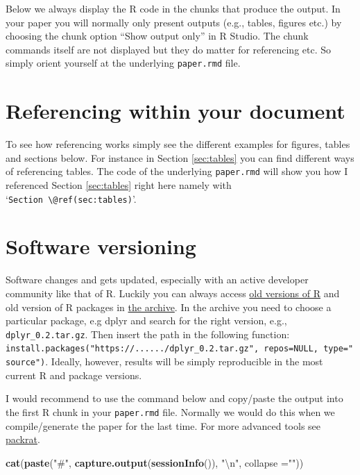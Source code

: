 \documentclass[12pt,]{article}
\newenvironment{Shaded}{\begin{snugshade}}{\end{snugshade}}
\newcommand{\KeywordTok}[1]{\textcolor[rgb]{0.13,0.29,0.53}{\textbf{#1}}}
\newcommand{\DataTypeTok}[1]{\textcolor[rgb]{0.13,0.29,0.53}{#1}}
\newcommand{\CharTok}[1]{\textcolor[rgb]{0.31,0.60,0.02}{#1}}
\newcommand{\StringTok}[1]{\textcolor[rgb]{0.31,0.60,0.02}{#1}}
\newcommand{\NormalTok}[1]{#1}
\theoremstyle{definition}
\theoremstyle{definition}
\theoremstyle{definition}
\theoremstyle{remark}
\begin{document}
Below we always display the R code in the chunks that produce the
output. In your paper you will normally only present outputs (e.g.,
tables, figures etc.) by choosing the chunk option ``Show output only''
in R Studio. The chunk commands itself are not displayed but they do
matter for referencing etc. So simply orient yourself at the underlying
\texttt{paper.rmd} file.

\section{Referencing within your
document}\label{referencing-within-your-document}

To see how referencing works simply see the different examples for
figures, tables and sections below. For instance in Section
\ref{sec:tables} you can find different ways of referencing tables. The
code of the underlying \texttt{paper.rmd} will show you how I referenced
Section \ref{sec:tables} right here namely with
`\texttt{Section\ \textbackslash{}@ref(sec:tables)}'.

\section{Software versioning}\label{software-versioning}

Software changes and gets updated, especially with an active developer
community like that of R. Luckily you can always access
\href{https://cran.r-project.org/bin/windows/base/old/}{old versions of
R} and old version of R packages in
\href{https://cran.r-project.org/src/contrib/Archive/}{the archive}. In
the archive you need to choose a particular package, e.g dplyr and
search for the right version, e.g., \texttt{dplyr\_0.2.tar.gz}. Then
insert the path in the following function:
\texttt{install.packages("https://....../dplyr\_0.2.tar.gz",\ repos=NULL,\ type="source")}.
Ideally, however, results will be simply reproducible in the most
current R and package versions.

I would recommend to use the command below and copy/paste the output
into the first R chunk in your \texttt{paper.rmd} file. Normally we
would do this when we compile/generate the paper for the last time. For
more advanced tools see
\href{https://rstudio.github.io/packrat/}{packrat}.

\begin{Shaded}
\begin{Highlighting}[]
\KeywordTok{cat}\NormalTok{(}\KeywordTok{paste}\NormalTok{(}\StringTok{"#"}\NormalTok{, }\KeywordTok{capture.output}\NormalTok{(}\KeywordTok{sessionInfo}\NormalTok{()), }\StringTok{"}\CharTok{\textbackslash{}n}\StringTok{"}\NormalTok{, }\DataTypeTok{collapse =}\StringTok{""}\NormalTok{)) }
\end{Highlighting}
\end{Shaded}
\end{document}
